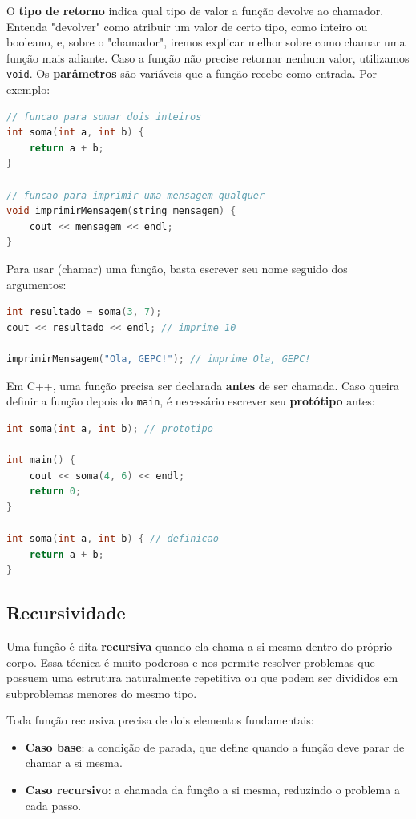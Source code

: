 \documentclass[12pt]{article}
\begin{document}
O \textbf{tipo de retorno} indica qual tipo de valor a função devolve ao chamador. Entenda "devolver" como atribuir um valor de certo tipo, como inteiro ou booleano, e, sobre o "chamador", iremos explicar melhor sobre como chamar uma função mais adiante. Caso a função não precise retornar nenhum valor, utilizamos \texttt{void}. Os \textbf{parâmetros} são variáveis que a função recebe como entrada. Por exemplo:

\begin{lstlisting}[language=C++]
// funcao para somar dois inteiros
int soma(int a, int b) {
    return a + b;
}

// funcao para imprimir uma mensagem qualquer
void imprimirMensagem(string mensagem) {
    cout << mensagem << endl;
}
\end{lstlisting}

Para usar (chamar) uma função, basta escrever seu nome seguido dos argumentos:

\begin{lstlisting}[language=C++]
int resultado = soma(3, 7);
cout << resultado << endl; // imprime 10

imprimirMensagem("Ola, GEPC!"); // imprime Ola, GEPC!
\end{lstlisting}

Em C++, uma função precisa ser declarada \textbf{antes} de ser chamada. Caso queira definir a função depois do \texttt{main}, é necessário escrever seu \textbf{protótipo} antes:

\begin{lstlisting}[language=C++]
int soma(int a, int b); // prototipo

int main() {
    cout << soma(4, 6) << endl;
    return 0;
}

int soma(int a, int b) { // definicao
    return a + b;
}
\end{lstlisting}

\subsection{Recursividade}

Uma função é dita \textbf{recursiva} quando ela chama a si mesma dentro do próprio corpo. Essa técnica é muito poderosa e nos permite resolver problemas que possuem uma estrutura naturalmente repetitiva ou que podem ser divididos em subproblemas menores do mesmo tipo.

Toda função recursiva precisa de dois elementos fundamentais:
\begin{itemize}
    \item \textbf{Caso base}: a condição de parada, que define quando a função deve parar de chamar a si mesma.
    \item \textbf{Caso recursivo}: a chamada da função a si mesma, reduzindo o problema a cada passo.
\end{itemize}
\end{document}
